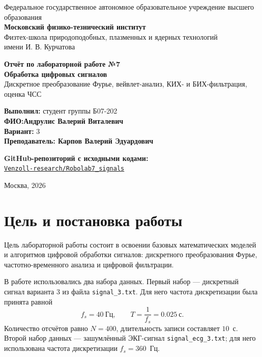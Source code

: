 \documentclass[a4paper,12pt]{article}
\begin{document}
\begin{titlepage}
\begin{center}
    \large
    Федеральное государственное автономное образовательное учреждение высшего образования\\
    \textbf{Московский физико-тезнический институт}\\[0.3cm]
    Физтех-школа природоподобных, плазменных и ядерных технологий\\
    имени И. В. Курчатова

    \vfill

    \textbf{Отчёт по лабораторной работе №7}\\[0.4cm]
    \Large\textbf{Обработка цифровых сигналов}\\[0.4cm]
    \normalsize
    Дискретное преобразование Фурье, вейвлет-анализ, КИХ- и БИХ-фильтрация, оценка ЧСС

    \vfill

    \begin{flushright}
        \textbf{Выполнил:} студент группы Б07-202 \\[0.2cm]
        \textbf{ФИО:Андрулис Валерий Виталевич} \\[0.2cm]
        \textbf{Вариант:} 3\\[0.2cm]
        \textbf{Преподаватель: Карпов Валерий Эдуардович}
    \end{flushright}

    \vfill

    \noindent\textbf{GitHub-репозиторий с исходными кодами:}\\
    \href{https://github.com/Venzoll-research/Robolab7_signals}{\texttt{Venzoll-research/Robolab7\_signals}}

    \vfill

    Москва, 2026
\end{center}
\end{titlepage}

\tableofcontents
\newpage

\section{Цель и постановка работы}

Цель лабораторной работы состоит в освоении базовых математических моделей и алгоритмов цифровой обработки сигналов: дискретного преобразования Фурье, частотно-временного анализа и цифровой фильтрации.

В работе использовались два набора данных. Первый набор --- дискретный сигнал варианта 3 из файла \texttt{signal\_3.txt}. Для него частота дискретизации была принята равной
\[
    f_s = 40~\text{Гц}, \qquad T = \frac{1}{f_s}=0.025~\text{с}.
\]
Количество отсчётов равно $N=400$, длительность записи составляет $10$~с. Второй набор данных --- зашумлённый ЭКГ-сигнал \texttt{signal\_ecg\_3.txt}; для него использована частота дискретизации $f_s=360$~Гц.
\end{document}
